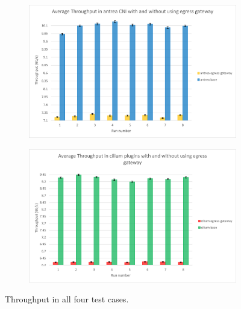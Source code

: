 \begin{figure}[H]
    \begin{subfigure}[b]{0.45\textwidth}
        \includegraphics[width=\textwidth]{plots/small/throughput_antrea.png}
        \caption{}
        \label{fig:throughput_c}
    \end{subfigure}
    \hfill
    \begin{subfigure}[b]{0.45\textwidth}
        \includegraphics[width=\textwidth]{plots/small/throughput_cilium.png}
        \caption{}
        \label{fig:throughput_d}
    \end{subfigure}
    
    \caption{Throughput in all four test cases.}
    \label{fig:throughFour}
\end{figure}

